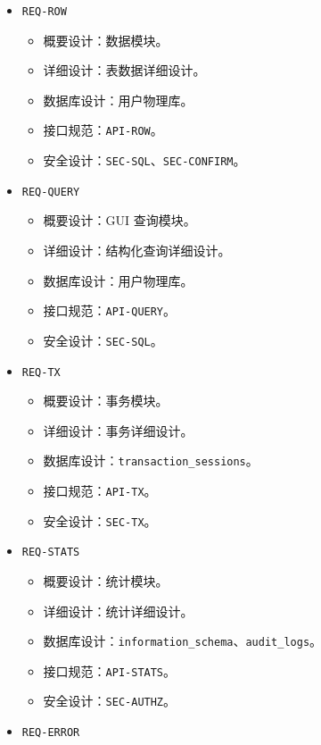 \documentclass[
  a4paper,
  UTF8]{ctexart}
\providecommand{\tightlist}{%
  \setlength{\itemsep}{0pt}\setlength{\parskip}{0pt}}
\begin{document}
\begin{itemize}
  \begin{itemize}
  \tightlist
  \item
    概要设计：视图模块。
  \item
    详细设计：元数据与表结构详细设计、结构化查询详细设计。
  \item
    数据库设计：\texttt{information\_schema}。
  \item
    接口规范：\texttt{API-VIEW}。
  \item
    安全设计：\texttt{SEC-SQL}。
  \end{itemize}
\item
  \texttt{REQ-ROW}

  \begin{itemize}
  \tightlist
  \item
    概要设计：数据模块。
  \item
    详细设计：表数据详细设计。
  \item
    数据库设计：用户物理库。
  \item
    接口规范：\texttt{API-ROW}。
  \item
    安全设计：\texttt{SEC-SQL}、\texttt{SEC-CONFIRM}。
  \end{itemize}
\item
  \texttt{REQ-QUERY}

  \begin{itemize}
  \tightlist
  \item
    概要设计：GUI 查询模块。
  \item
    详细设计：结构化查询详细设计。
  \item
    数据库设计：用户物理库。
  \item
    接口规范：\texttt{API-QUERY}。
  \item
    安全设计：\texttt{SEC-SQL}。
  \end{itemize}
\item
  \texttt{REQ-TX}

  \begin{itemize}
  \tightlist
  \item
    概要设计：事务模块。
  \item
    详细设计：事务详细设计。
  \item
    数据库设计：\texttt{transaction\_sessions}。
  \item
    接口规范：\texttt{API-TX}。
  \item
    安全设计：\texttt{SEC-TX}。
  \end{itemize}
\item
  \texttt{REQ-STATS}

  \begin{itemize}
  \tightlist
  \item
    概要设计：统计模块。
  \item
    详细设计：统计详细设计。
  \item
    数据库设计：\texttt{information\_schema}、\texttt{audit\_logs}。
  \item
    接口规范：\texttt{API-STATS}。
  \item
    安全设计：\texttt{SEC-AUTHZ}。
  \end{itemize}
\item
  \texttt{REQ-ERROR}


\end{itemize}
\end{document}
